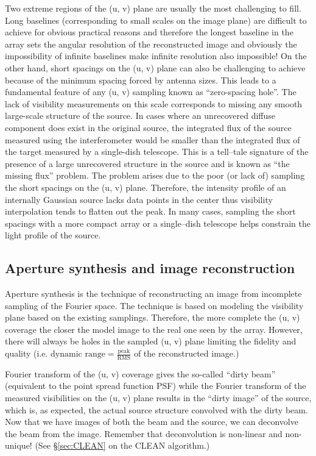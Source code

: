 \documentclass[a4wide,12pt]{book}
\begin{document}
{Two extreme regions of the (u, v) plane are usually the most challenging to fill. Long baselines (corresponding to small scales on the image plane) are difficult to achieve for obvious practical reasons and therefore the longest baseline in the array sets the angular resolution of the reconstructed image and obviously the impossibility of infinite baselines make infinite resolution also impossible! On the other hand, short spacings on the (u, v) plane can also be challenging to achieve because of the minimum spacing forced by antenna sizes. This leads to a fundamental feature of any (u, v) sampling known as ``zero-spacing hole''. The lack of visibility measurements on this scale corresponds to missing any smooth large-scale structure of the source. In cases where an unrecovered diffuse component does exist in the original source, the integrated flux of the source measured using the interferometer would be smaller than the integrated flux of the target measured by a single-dish telescope. This is a tell--tale signature of the presence of a large unrecovered structure in the source and is known as ``the missing flux'' problem. The problem arises due to the poor (or lack of) sampling the short spacings on the (u, v) plane. Therefore, the intensity profile of an internally Gaussian source lacks data points in the center thus visibility interpolation tends to flatten out the peak. In many cases, sampling the short spacings with a more compact array or a single--dish telescope helps constrain the light profile of the source.

\subsection*{Aperture synthesis and image reconstruction}
Aperture synthesis is the technique of reconstructing an image from incomplete sampling of the Fourier space. The technique is based on modeling the visibility plane based on the existing samplings. Therefore, the more complete the (u, v) coverage the closer the model image to the real one seen by the array. However, there will always be holes in the sampled (u, v) plane limiting the fidelity and quality (i.e. $\text{dynamic range} = \frac{\text{peak}}{\text{RMS}}$ of the reconstructed image.)

Fourier transform of the (u, v) coverage gives the so-called ``dirty beam'' (equivalent to the point spread function PSF) while the Fourier transform of the measured visibilities on the (u, v) plane results in the ``dirty image'' of the source, which is, as expected, the actual source structure convolved with the dirty beam. Now that we have images of both the beam and the source, we can deconvolve the beam from the image. Remember that deconvolution is non-linear and non-unique! (See \S \ref{sec:CLEAN} on the CLEAN algorithm.)

}
\end{document}
